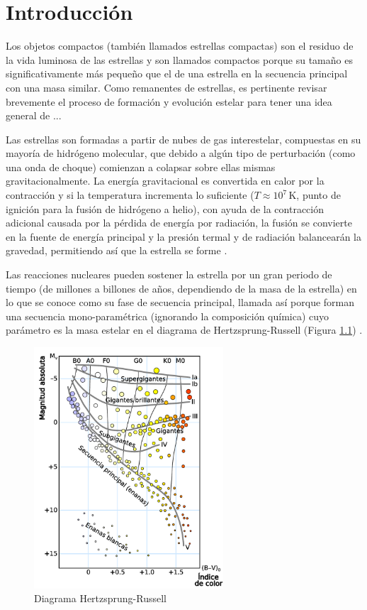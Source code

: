 \chapter{Introducción}

Los objetos compactos (también llamados estrellas compactas) son el residuo de la vida luminosa de las estrellas y son llamados compactos porque su tamaño es significativamente más pequeño que el de una estrella en la secuencia principal con una masa similar. Como remanentes de estrellas, es pertinente revisar brevemente el proceso de formación y evolución estelar para tener una idea general de ...  

Las estrellas son formadas a partir de nubes de gas interestelar, compuestas en su mayoría de hidrógeno molecular, que debido a algún tipo de perturbación (como una onda de choque) comienzan a colapsar sobre ellas mismas gravitacionalmente. La energía gravitacional es convertida en calor por la contracción y si la temperatura incrementa lo suficiente ($T \approx 10^7 \, \si{\kelvin}$, punto de ignición para la fusión de hidrógeno a helio), con ayuda de la contracción adicional causada por la pérdida de energía por radiación, la fusión se convierte en la fuente de energía principal y la presión termal y de radiación balancearán la gravedad, permitiendo así que la estrella se forme \cite{Glendenning2000CompactStars}.

Las reacciones nucleares pueden sostener la estrella por un gran periodo de tiempo (de millones a billones de años, dependiendo de la masa de la estrella) en lo que se conoce como su fase de secuencia principal, llamada así porque forman una secuencia mono-paramétrica (ignorando la composición química) cuyo parámetro es la masa estelar en el diagrama de Hertzsprung-Russell (Figura \ref{HR}) \cite{Scilla2016IntroductionEvolution}. 

\begin{figure}[H]
    \centering
    \includegraphics[width=200pt]{figures/H-R_diagram.pdf}
    \caption{Diagrama Hertzsprung-Russell}
    \label{HR}
\end{figure}

